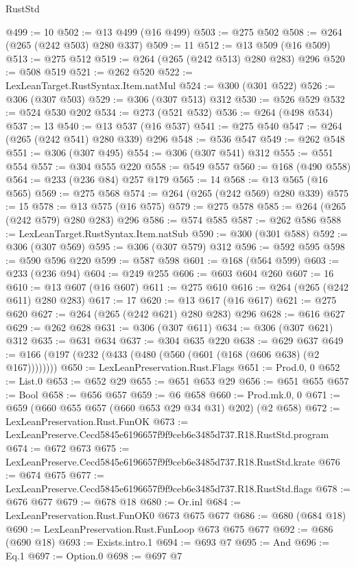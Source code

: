 \begin{lexlean}{RustStd}
\begin{coremodule}
@499 := 10
@502 := @13 @499 (@16 @499)
@503 := @275 @502
@508 := @264 (@265 (@242 @503) @280 @337)
@509 := 11
@512 := @13 @509 (@16 @509)
@513 := @275 @512
@519 := @264 (@265 (@242 @513) @280 @283) @296
@520 := @508 @519
@521 := @262 @520
@522 := LexLeanTarget.RustSyntax.Item.natMul
@524 := @300 (@301 @522)
@526 := @306 (@307 @503)
@529 := @306 (@307 @513) @312
@530 := @526 @529
@532 := @524 @530 @202
@534 := @273 (@521 @532)
@536 := @264 (@498 @534)
@537 := 13
@540 := @13 @537 (@16 @537)
@541 := @275 @540
@547 := @264 (@265 (@242 @541) @280 @339) @296
@548 := @536 @547
@549 := @262 @548
@551 := @306 (@307 @495)
@554 := @306 (@307 @541) @312
@555 := @551 @554
@557 := @304 @555 @220
@558 := @549 @557
@560 := @168 (@490 @558)
@564 := @233 (@236 @84) @257 @179
@565 := 14
@568 := @13 @565 (@16 @565)
@569 := @275 @568
@574 := @264 (@265 (@242 @569) @280 @339)
@575 := 15
@578 := @13 @575 (@16 @575)
@579 := @275 @578
@585 := @264 (@265 (@242 @579) @280 @283) @296
@586 := @574 @585
@587 := @262 @586
@588 := LexLeanTarget.RustSyntax.Item.natSub
@590 := @300 (@301 @588)
@592 := @306 (@307 @569)
@595 := @306 (@307 @579) @312
@596 := @592 @595
@598 := @590 @596 @220
@599 := @587 @598
@601 := @168 (@564 @599)
@603 := @233 (@236 @94)
@604 := @249 @255
@606 := @603 @604 @260
@607 := 16
@610 := @13 @607 (@16 @607)
@611 := @275 @610
@616 := @264 (@265 (@242 @611) @280 @283)
@617 := 17
@620 := @13 @617 (@16 @617)
@621 := @275 @620
@627 := @264 (@265 (@242 @621) @280 @283) @296
@628 := @616 @627
@629 := @262 @628
@631 := @306 (@307 @611)
@634 := @306 (@307 @621) @312
@635 := @631 @634
@637 := @304 @635 @220
@638 := @629 @637
@649 := @166 (@197 (@232 (@433 (@480 (@560 (@601 (@168 (@606 @638) (@2 @167))))))))
@650 := LexLeanPreservation.Rust.Flags
@651 := Prod.{0, 0}
@652 := List.{0}
@653 := @652 @29
@655 := @651 @653 @29
@656 := @651 @655
@657 := Bool
@658 := @656 @657
@659 := @6 @658
@660 := Prod.mk.{0, 0}
@671 := @659 (@660 @655 @657 (@660 @653 @29 @34 @31) @202) (@2 @658)
@672 := LexLeanPreservation.Rust.FunOK
@673 := LexLeanPreserve.Cecd5845e6196657f9f9ceb6e3485d737.R18.RustStd.program
@674 := @672 @673
@675 := LexLeanPreserve.Cecd5845e6196657f9f9ceb6e3485d737.R18.RustStd.krate
@676 := @674 @675
@677 := LexLeanPreserve.Cecd5845e6196657f9f9ceb6e3485d737.R18.RustStd.flags
@678 := @676 @677
@679 := @678 @18
@680 := Or.inl
@684 := LexLeanPreservation.Rust.FunOK0 @673 @675 @677
@686 := @680 (@684 @18)
@690 := LexLeanPreservation.Rust.FunLoop @673 @675 @677
@692 := @686 (@690 @18)
@693 := Exists.intro.{1}
@694 := @693 @7
@695 := And
@696 := Eq.{1}
@697 := Option.{0}
@698 := @697 @7

\end{coremodule}
\end{lexlean}
